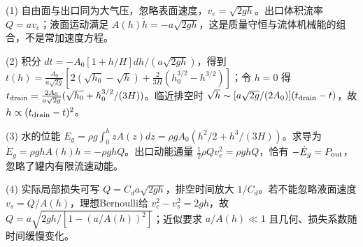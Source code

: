 (1) 自由面与出口同为大气压，忽略表面速度，\(v_e=\sqrt{2gh}\)。出口体积流率 \(Q=av_e\)；液面运动满足 \(A(h)\dot h=-a\sqrt{2gh}\)，这是质量守恒与流体机械能的组合，不是常加速度方程。

(2) 积分 \(dt=-A_0[1+h/H]dh/(a\sqrt{2gh})\)，得到 \(t(h)=\frac{A_0}{a\sqrt{2g}}[2(\sqrt{h_0}-\sqrt h)+\frac{2}{3H}(h_0^{3/2}-h^{3/2})]\)；令 \(h=0\) 得 \(t_{\rm drain}=\frac{2A_0}{a\sqrt{2g}}(\sqrt{h_0}+h_0^{3/2}/(3H))\)。临近排空时 \(\sqrt h\sim[a\sqrt{2g}/(2A_0)](t_{\rm drain}-t)\)，故 \(h\propto(t_{\rm drain}-t)^2\)。

(3) 水的位能 \(E_g=\rho g\int_0^h zA(z)dz=\rho gA_0(h^2/2+h^3/(3H))\)。求导为 \(\dot E_g=\rho ghA(h)\dot h=-\rho g hQ\)。出口动能通量 \(\frac12\rho Qv_e^2=\rho ghQ\)，恰有 \(-\dot E_g=P_{\rm out}\)，忽略了罐内有限流速动能。

(4) 实际局部损失可写 \(Q=C_da\sqrt{2gh}\)，排空时间放大 \(1/C_d\)。若不能忽略液面速度 \(v_s=Q/A(h)\)，理想Bernoulli给 \(v_e^2-v_s^2=2gh\)，故 \(Q=a\sqrt{2gh/[1-(a/A(h))^2]}\)；近似要求 \(a/A(h)\ll1\) 且几何、损失系数随时间缓慢变化。
